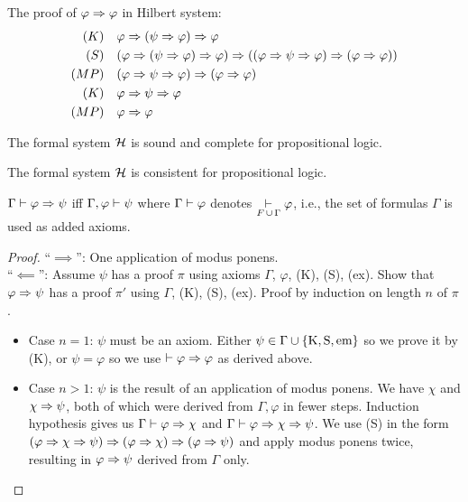 \begin{example}
    The proof of $\varphi \Rightarrow \varphi$ in Hilbert system:
    \begin{align*}
(K) \quad & \varphi \Rightarrow (\psi \Rightarrow \varphi) \Rightarrow \varphi\\
(S)  \quad &(\varphi \Rightarrow (\psi \Rightarrow \varphi) \Rightarrow \varphi) \Rightarrow ((\varphi \Rightarrow \psi \Rightarrow \varphi) \Rightarrow (\varphi \Rightarrow \varphi))\\
(MP) \quad & (\varphi \Rightarrow \psi \Rightarrow \varphi) \Rightarrow (\varphi \Rightarrow \varphi)\\
(K)  \quad &\varphi \Rightarrow \psi \Rightarrow \varphi\\
(MP) \quad &  \varphi \Rightarrow \varphi\\
    \end{align*}
\end{example}

\begin{theorem}
  The formal system $\mathcal{H}$ is sound and complete for propositional logic.
\end{theorem}

\begin{corollary}
    The formal system $\mathcal{H}$ is consistent for propositional logic.
\end{corollary}

\begin{theorem}
    $\Gamma \vdash \varphi \Rightarrow \psi$ iff $\Gamma, \varphi \vdash \psi$ where $\Gamma \vdash \varphi$ denotes $\underset{F \,\cup\, \Gamma}{\vdash} \varphi$, i.e., the set of formulas $\Gamma$ is used as added axioms.
\end{theorem}
\begin{proof}
    ``$\implies$'': One application of modus ponens.\\
    ``$\impliedby$'': 
Assume $\psi$ has a proof $\pi$ using axioms $\Gamma$, $\varphi$, (K), (S), (ex). Show that $\varphi \Rightarrow \psi$ has a proof $\pi'$ using $\Gamma$, (K), (S), (ex). Proof by induction on length $n$ of $\pi$.
\begin{itemize}
    \item Case $n=1$: $\psi$ must be an axiom.
Either $\psi \in \Gamma \cup \{\textup{K}, \textup{S}, \textup{em}\}$ so we prove it by (K),
or $\psi = \varphi$ so we use $\vdash \varphi \Rightarrow \varphi$ as derived above.
\item Case $n>1$: $\psi$ is the result of an application of modus ponens.
We have $\chi$ and $\chi \Rightarrow \psi$, both of which were derived from $\Gamma, \varphi$ in fewer steps.
Induction hypothesis gives us $\Gamma \vdash \varphi \Rightarrow \chi$ and $\Gamma \vdash \varphi \Rightarrow \chi \Rightarrow \psi$.
We use (S) in the form $(\varphi \Rightarrow \chi \Rightarrow \psi) \Rightarrow (\varphi \Rightarrow \chi) \Rightarrow (\varphi \Rightarrow \psi)$ and apply modus ponens twice,
resulting in $\varphi \Rightarrow \psi$ derived from $\Gamma$ only.
\end{itemize}
\end{proof}

